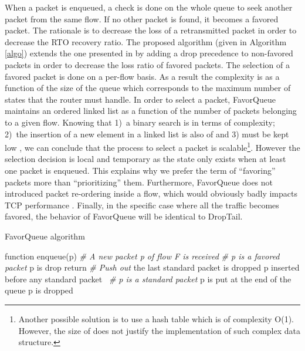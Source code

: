 \documentclass{elsart}
\begin{document}
When a packet is enqueued, a check is done on the whole queue to seek another packet from the same flow. If no other packet is found, it becomes a favored packet. The rationale is to decrease the loss of a retransmitted packet in order to decrease the RTO recovery ratio.
The proposed algorithm (given in Algorithm \ref{algo}) extends the one presented in \cite{dedu09pdp} by adding a drop precedence to non-favored packets in order to decrease the loss ratio of favored packets.
The selection of a favored packet is done on a per-flow basis. As a result the complexity is as a function of the size of the queue which corresponds to the maximum number of states that the router must handle. In order to select a packet, FavorQueue maintains an ordered linked list as a function of the number of packets belonging to a given flow. Knowing that 1)~a binary search is  in terms of complexity; 2)~the insertion of a new element in a linked list is also of  and 3)  must be kept low \cite{Appenzeller04}, we can conclude that the process to select a packet is scalable\footnote{Another possible solution is to use a hash table which is of complexity O(1). However, the size of  does not justify the implementation of such complex data structure.}.
    However the selection decision is local and temporary as the state only exists when at least one packet is enqueued. This explains why we prefer the term of ``favoring'' packets more than ``prioritizing'' them. Furthermore, FavorQueue does not introduced packet re-ordering inside a flow, which would obviously badly impacts TCP performance \cite{Arthur07}. 
Finally, in the specific case where all the traffic becomes favored, the behavior of FavorQueue will be identical to DropTail.

\begin{algorithm}[t]
\caption{FavorQueue algorithm}
\label{algo}
\begin{algorithmic}[1]
\STATE function enqueue(p)
\STATE \textit{\# A new packet p of flow F is received}
\STATE \textit{\# p is a favored packet}
 			\STATE p is drop
			\STATE return
		\ENDIF
        \ELSE
            	\STATE \textit{\# Push out}
		\STATE the last standard packet is dropped
	\ENDIF
\STATE  p inserted before any standard packet\ 
\ELSE
	\STATE \textit{\# p is a standard packet}
		\STATE p is put at the end of the queue
	\ELSE
		\STATE p is dropped
	\ENDIF 
\ENDIF 
\end{algorithmic}
\end{algorithm}
\end{document}
